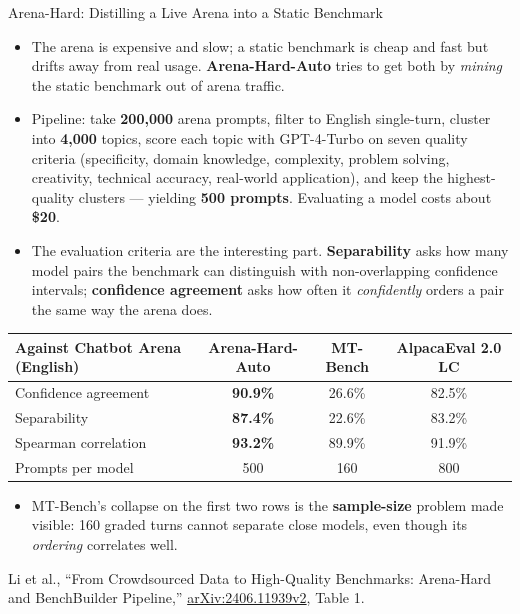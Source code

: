 \begin{frame}{Arena-Hard: Distilling a Live Arena into a Static Benchmark}
  \begin{itemize}\footnotesize\itemsep0.05em
    \item[\textcolor{red}{$\blacktriangleright$}] The arena is expensive and slow; a static benchmark is cheap and fast but drifts away from real usage. \textbf{Arena-Hard-Auto} tries to get both by \textit{mining} the static benchmark out of arena traffic.
    \item[\textcolor{red}{$\blacktriangleright$}] Pipeline: take \textbf{200{,}000} arena prompts, filter to English single-turn, cluster into \textbf{4{,}000} topics, score each topic with GPT-4-Turbo on seven quality criteria (specificity, domain knowledge, complexity, problem solving, creativity, technical accuracy, real-world application), and keep the highest-quality clusters --- yielding \textbf{500 prompts}. Evaluating a model costs about \textbf{\$20}.
    \item[\textcolor{red}{$\blacktriangleright$}] The evaluation criteria are the interesting part. \textbf{Separability} asks how many model pairs the benchmark can distinguish with non-overlapping confidence intervals; \textbf{confidence agreement} asks how often it \textit{confidently} orders a pair the same way the arena does.
  \end{itemize}
  {\centering\scriptsize
  \begin{tabular}{lccc}
    \toprule
    Against Chatbot Arena (English) & Arena-Hard-Auto & MT-Bench & AlpacaEval 2.0 LC \\
    \midrule
    Confidence agreement & \textbf{90.9\%} & 26.6\% & 82.5\% \\
    Separability          & \textbf{87.4\%} & 22.6\% & 83.2\% \\
    Spearman correlation  & \textbf{93.2\%} & 89.9\% & 91.9\% \\
    Prompts per model     & 500 & 160 & 800 \\
    \bottomrule
  \end{tabular}\par}
  \begin{itemize}\footnotesize
    \item[\textcolor{red}{$\blacktriangleright$}] MT-Bench's collapse on the first two rows is the \textbf{sample-size} problem made visible: 160 graded turns cannot separate close models, even though its \textit{ordering} correlates well.
  \end{itemize}
  {\scriptsize Li et al., ``From Crowdsourced Data to High-Quality Benchmarks: Arena-Hard and BenchBuilder Pipeline,'' \href{https://arxiv.org/abs/2406.11939v2}{arXiv:2406.11939v2}, Table 1.}
\end{frame}

